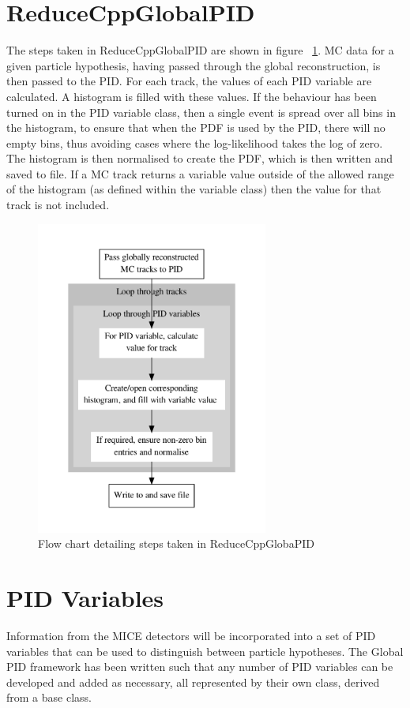 \section{ReduceCppGlobalPID}
\label{reducer}
The steps taken in ReduceCppGlobalPID are shown in figure ~\ref{reduceflow}. MC data for a given particle hypothesis, having passed through the global reconstruction, is then passed to the PID. For each track, the values of each PID variable are calculated. A histogram is filled with these values. If the behaviour has been turned on in the PID variable class, then a single event is spread over all bins in the histogram, to ensure that when the PDF is used by the PID, there will no empty bins, thus avoiding cases where the log-likelihood takes the log of zero. The histogram is then normalised to create the PDF, which is then written and saved to file.
If a MC track returns a variable value outside of the allowed range of the histogram (as defined within the variable class) then the value for that track is not included.
\begin{figure}[h!]
\begin{center} 
\includegraphics[width=3in]{reconstruction/globalpid/PDFflow.pdf} 
\caption{Flow chart detailing steps taken in ReduceCppGlobaPID}
\label{reduceflow}
\end{center} 
\end{figure}

\section{PID Variables}
\label{PID}
Information from the MICE detectors will be incorporated into a set of 
PID variables that can be used to distinguish between particle 
hypotheses.
The Global PID framework has been written such that any number of PID 
variables can be developed and added as necessary, all represented by 
their own class, derived from a base class.

